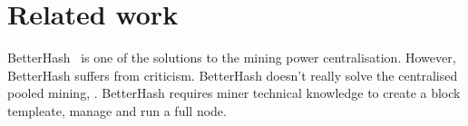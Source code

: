 \section{Related work}




BetterHash~\cite{draft-bip-BetterHash} is one of the solutions to the mining power centralisation.
However, BetterHash suffers from criticism.
BetterHash doesn't really solve the centralised pooled mining, .
BetterHash requires miner technical knowledge to create a block templeate, manage and run a full node.
